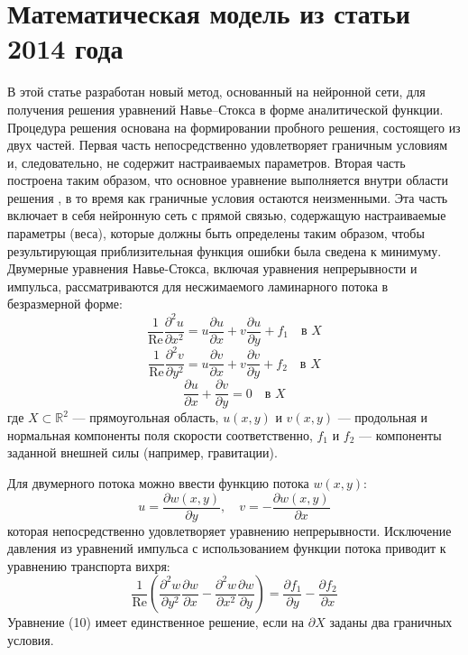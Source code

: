 \documentclass[a4paper,12pt]{article}
\theoremstyle{plain} %
\theoremstyle{definition} %
\theoremstyle{remark} %
\begin{document}
\section{Математическая модель из статьи 2014 года}
В этой статье разработан новый метод, основанный на нейронной
сети, для получения решения уравнений
Навье–Стокса в форме аналитической функции.
Процедура решения основана на формировании пробного
решения, состоящего из двух частей. Первая часть непосредственно
удовлетворяет граничным условиям и, следовательно, не содержит
настраиваемых параметров. Вторая часть построена таким
образом, что основное уравнение выполняется внутри области решения
, в то время как граничные условия остаются неизменными.
Эта часть включает в себя нейронную сеть с прямой связью, содержащую настраиваемые параметры (веса), которые должны быть
определены таким образом, чтобы результирующая приблизительная
функция ошибки была сведена к минимуму. 
Двумерные уравнения Навье-Стокса, включая уравнения непрерывности и импульса, рассматриваются для несжимаемого ламинарного потока в безразмерной форме:
\[
\frac{1}{\text{Re}} \frac{\partial^2 u}{\partial x^2} = u \frac{\partial u}{\partial x} + v \frac{\partial u}{\partial y} + f_1 \quad \text{в } X
\]
\[
\frac{1}{\text{Re}} \frac{\partial^2 v}{\partial y^2} = u \frac{\partial v}{\partial x} + v \frac{\partial v}{\partial y} + f_2 \quad \text{в } X
\]
\[
\frac{\partial u}{\partial x} + \frac{\partial v}{\partial y} = 0 \quad \text{в } X
\]
где $X \subset \mathbb{R}^2$ — прямоугольная область, $u(x, y)$ и $v(x, y)$ — продольная и нормальная компоненты поля скорости соответственно, $f_1$ и $f_2$ — компоненты заданной внешней силы (например, гравитации).

Для двумерного потока можно ввести функцию потока $w(x, y)$:
\begin{equation}
u = \frac{\partial w(x, y)}{\partial y}, \quad v = -\frac{\partial w(x, y)}{\partial x}
\end{equation}
которая непосредственно удовлетворяет уравнению непрерывности. Исключение давления из уравнений импульса с использованием функции потока приводит к уравнению транспорта вихря:
\begin{equation}
\frac{1}{\text{Re}} \left( \frac{\partial^2 w}{\partial y^2} \frac{\partial w}{\partial x} - \frac{\partial^2 w}{\partial x^2} \frac{\partial w}{\partial y} \right) = \frac{\partial f_1}{\partial y} - \frac{\partial f_2}{\partial x}
\end{equation}
Уравнение (10) имеет единственное решение, если на $\partial X$ заданы два граничных условия.
\end{document}

